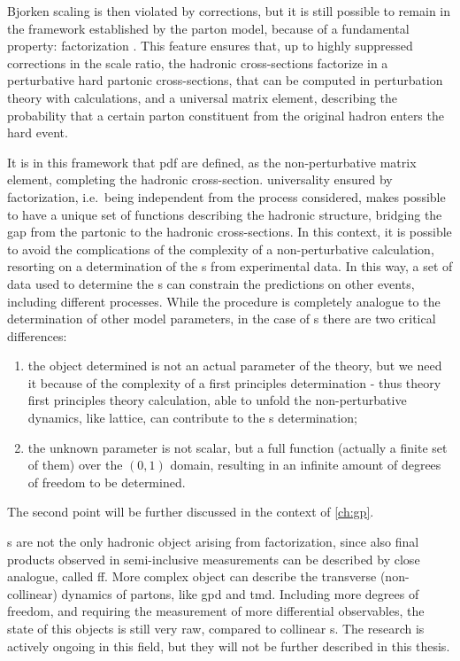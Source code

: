 Bjorken scaling is then violated by \qcd corrections, but it is still possible
to remain in the framework established by the parton model, because of a
fundamental \qcd property: factorization \cite{Collins:1989gx}.
%
This feature ensures that, up to highly suppressed corrections in the scale
ratio, the hadronic cross-sections factorize in a perturbative hard partonic
cross-sections, that can be computed in perturbation theory with \pqft
calculations, and a universal matrix element, describing the probability that a
certain parton constituent from the original hadron enters the hard event.

It is in this framework that \acrfull{pdf} are defined, as the non-perturbative
matrix element, completing the hadronic cross-section.
\pdf universality ensured by factorization, i.e.\ being independent from the
process considered, makes possible to have a unique set of functions describing
the hadronic structure, bridging the gap from the partonic to the hadronic
cross-sections.
%
In this context, it is possible to avoid the complications of the complexity of
a non-perturbative calculation, resorting on a determination of the \pdf{}s
from experimental data.
In this way, a set of data used to determine the \pdf{}s can constrain the
predictions on other events, including different processes.
%
While the procedure is completely analogue to the determination of other \sm
model parameters, in the case of \pdf{}s there are two critical differences:
\begin{enumerate}
	\item the object determined is not an actual parameter of the theory, but
	      we need it because of the complexity of a first principles
	      determination - thus theory first principles theory calculation, able
	      to unfold the non-perturbative dynamics, like lattice, can contribute
	      to the \pdf{}s determination;
	\item the unknown parameter is not scalar, but a full function (actually a
	      finite set of them) over the $(0,1)$ domain, resulting in an infinite
	      amount of degrees of freedom to be determined.
\end{enumerate}
The second point will be further discussed in the context of \cref{ch:gp}.

\pdf{}s are not the only hadronic object arising from factorization, since also
final products observed in semi-inclusive measurements can be described by
close analogue, called \acrfull{ff}.
%
More complex object can describe the transverse (non-collinear) dynamics of
partons, like \acrfull{gpd} and \acrfull{tmd}.
Including more degrees of freedom, and requiring the measurement of more
differential observables, the state of this objects is still very raw, compared
to collinear \pdf{}s.
%
The research is actively ongoing in this field, but they will not be further
described in this thesis.

